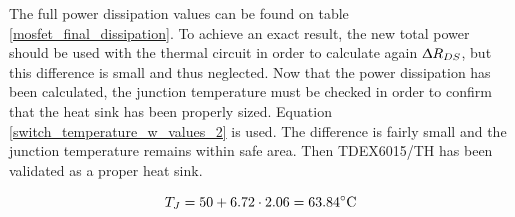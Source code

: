 The full power dissipation values can be found on table \ref{mosfet_final_dissipation}. To achieve an exact result, the new total power should be used with the thermal circuit in order to calculate again $\Updelta R_{DS}$, but this difference is small and thus neglected. Now that the power dissipation has been calculated, the junction temperature must be checked in order to confirm that the heat sink has been properly sized. Equation \ref{switch_temperature_w_values_2} is used. The difference is fairly small and the junction temperature remains within safe area. Then TDEX6015/TH has been validated as a proper heat sink.

\begin{equation} \label{switch_temperature_w_values_2}
T_{J} = 50 + 6.72 \cdot  2.06 = 63.84 \decC
\end{equation}



